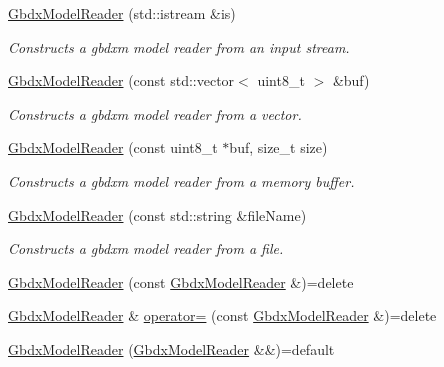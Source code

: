 \begin{DoxyCompactItemize}
\item 
\hyperlink{group___classification_module_gaf76d6b5a7aedc2124731adf9e3858853}{Gbdx\+Model\+Reader} (std\+::istream \&is)
\begin{DoxyCompactList}\small\item\em Constructs a gbdxm model reader from an input stream. \end{DoxyCompactList}\item 
\hyperlink{group___classification_module_ga3253da2225ab14f864894af9ddea77db}{Gbdx\+Model\+Reader} (const std\+::vector$<$ uint8\+\_\+t $>$ \&buf)
\begin{DoxyCompactList}\small\item\em Constructs a gbdxm model reader from a vector. \end{DoxyCompactList}\item 
\hyperlink{group___classification_module_ga5f5b18f2c2c2349d68cf670d8f7ea3ec}{Gbdx\+Model\+Reader} (const uint8\+\_\+t $\ast$buf, size\+\_\+t size)
\begin{DoxyCompactList}\small\item\em Constructs a gbdxm model reader from a memory buffer. \end{DoxyCompactList}\item 
\hyperlink{group___classification_module_ga1a936c6873d8a865411691d42d37ca28}{Gbdx\+Model\+Reader} (const std\+::string \&file\+Name)
\begin{DoxyCompactList}\small\item\em Constructs a gbdxm model reader from a file. \end{DoxyCompactList}\item 
\hyperlink{classdg_1_1deepcore_1_1classification_1_1_gbdx_model_reader_a3f90482a7b8d7af6e5722af4a862000d}{Gbdx\+Model\+Reader} (const \hyperlink{classdg_1_1deepcore_1_1classification_1_1_gbdx_model_reader}{Gbdx\+Model\+Reader} \&)=delete
\item 
\hyperlink{classdg_1_1deepcore_1_1classification_1_1_gbdx_model_reader}{Gbdx\+Model\+Reader} \& \hyperlink{classdg_1_1deepcore_1_1classification_1_1_gbdx_model_reader_a448613f6bbdf70e453d25ac2a1fca6a5}{operator=} (const \hyperlink{classdg_1_1deepcore_1_1classification_1_1_gbdx_model_reader}{Gbdx\+Model\+Reader} \&)=delete
\item 
\hyperlink{classdg_1_1deepcore_1_1classification_1_1_gbdx_model_reader_aff78e92e8291fc5dd406e0c5a76805d9}{Gbdx\+Model\+Reader} (\hyperlink{classdg_1_1deepcore_1_1classification_1_1_gbdx_model_reader}{Gbdx\+Model\+Reader} \&\&)=default

\end{DoxyCompactItemize}
